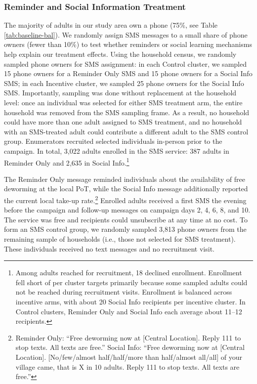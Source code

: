 \subsubsection{Reminder and Social Information Treatment}
The majority of adults in our study area own a phone (75\%, see Table
\ref{tab:baseline-bal}). We randomly assign SMS messages to a small share of phone owners (fewer than 10\%) to test whether reminders or social learning mechanisms help explain our treatment effects. Using the household census, we randomly sampled phone owners for SMS assignment: in each Control cluster, we sampled 15 phone owners for a Reminder Only SMS and 15 phone owners for a Social Info SMS; in each Incentive cluster, we sampled 25 phone owners for the Social Info SMS. Importantly, sampling was done without replacement at the household level: once an individual was selected for either SMS treatment arm, the entire household was removed from the SMS sampling frame. As a result, no household could have more than one adult assigned to SMS treatment, and no household with an SMS-treated adult could contribute a different adult to the SMS control group. Enumerators recruited selected individuals in-person prior to the campaign. In total, 3{,}022 adults enrolled in the SMS service: 387 adults in Reminder Only and 2{,}635 in Social Info.\footnote{Among adults reached for recruitment, 18 declined enrollment. Enrollment fell short of per cluster targets primarily because some sampled adults could not be reached during recruitment visits. Enrollment is balanced across incentive arms, with about 20 Social Info recipients per incentive cluster. In Control clusters, Reminder Only and Social Info each average about 11--12 recipients.}

The Reminder Only message reminded individuals about the availability of free deworming at the local PoT, while the Social Info message additionally reported the current local take-up rate.\footnote{Reminder Only: ``Free
deworming now at [Central Location]. Reply 111 to stop texts. All texts are free.'' Social Info: ``Free deworming now at [Central Location]. [No/few/almost half/half/more than half/almost all/all] of your village came, that is X in 10
adults. Reply 111 to stop texts. All texts are free.''} Enrolled adults received a first SMS the evening before the campaign and follow-up messages on campaign days 2, 4, 6, 8, and 10. The service was free and recipients could unsubscribe at any time at no cost. To form an SMS control group, we randomly sampled 3{,}813 phone owners from the remaining sample of households (i.e., those not selected for SMS treatment). These individuals received no text messages and no recruitment visit.%


